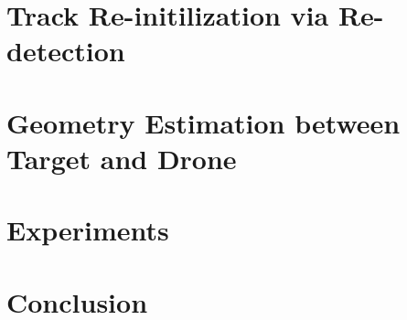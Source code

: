 \documentclass[10pt,twocolumn,letterpaper]{article}
\newcounter{ct}
\begin{document}
\section{Track Re-initilization via Re-detection}
\label{sc:Re-initialization}

\section{Geometry Estimation between Target and Drone}
\label{sc:Geometry}

\section{Experiments}
\label{sc:Experiments}

\section{Conclusion}
\label{sc:Conclusion}


\small


\end{document}
